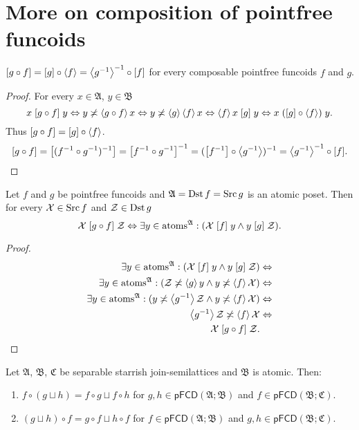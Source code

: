 \section{More on composition of pointfree funcoids}
\begin{prop}
$\mathord{\mathrel{\left[g\circ f\right]}}=\mathord{\mathrel{\left[g\right]}}\circ\left\langle f\right\rangle=\left\langle g^{-1}\right\rangle^{-1}\circ\mathord{\mathrel{\left[f\right]}}$
for every composable pointfree funcoids $f$ and $g$.\end{prop}
\begin{proof}
For every $x\in\mathfrak{A}$, $y\in\mathfrak{B}$
\[
x\mathrel{\left[g\circ f\right]}y\Leftrightarrow y\not\asymp\left\langle g\circ f\right\rangle x\Leftrightarrow y\not\asymp\left\langle g\right\rangle\left\langle f\right\rangle x\Leftrightarrow\left\langle f\right\rangle x\mathrel{\left[g\right]}y\Leftrightarrow x\mathrel{(\mathord{\mathrel{\left[g\right]}}\circ\left\langle f\right\rangle)}y.
\]
Thus $\mathord{\mathrel{\left[g\circ f\right]}}=\mathord{\mathrel{\left[g\right]}}\circ\left\langle f\right\rangle$.
\[
\mathord{\mathrel{\left[g\circ f\right]}}=\mathord{\mathrel{\left[(f^{-1}\circ g^{-1})^{-1}\right]}}=\mathord{\mathrel{\left[f^{-1}\circ g^{-1}\right]}}^{-1}=(\mathord{\mathrel{\left[f^{-1}\right]}}\circ\left\langle g^{-1}\right\rangle)^{-1}=\left\langle g^{-1}\right\rangle^{-1}\circ\mathord{\mathrel{\left[f\right]}}.
\]
\end{proof}
\begin{thm}
\label{pf-fcd-atom-middle}Let $f$ and $g$ be pointfree funcoids
and $\mathfrak{A}=\operatorname{Dst} f=\operatorname{Src} g$ is an atomic poset. Then for every
$\mathcal{X}\in\operatorname{Src} f$ and $\mathcal{Z}\in\operatorname{Dst} g$
\[
\mathcal{X}\mathrel{\left[g\circ f\right]}\mathcal{Z}\Leftrightarrow\exists y\in\operatorname{atoms}^{\mathfrak{A}}:(\mathcal{X}\mathrel{\left[f\right]}y\land y\mathrel{\left[g\right]}\mathcal{Z}).
\]
\end{thm}
\begin{proof}
~
\begin{align*}
\exists y\in\operatorname{atoms}^{\mathfrak{A}}:(\mathcal{X}\mathrel{\left[f\right]}y\land y\mathrel{\left[g\right]}\mathcal{Z}) & \Leftrightarrow\\
\exists y\in\operatorname{atoms}^{\mathfrak{A}}:(\mathcal{Z}\not\asymp\left\langle g\right\rangle y\land y\not\asymp\left\langle f\right\rangle\mathcal{X}) & \Leftrightarrow\\
\exists y\in\operatorname{atoms}^{\mathfrak{A}}:(y\not\asymp\left\langle g^{-1}\right\rangle\mathcal{Z}\land y\not\asymp\left\langle f\right\rangle\mathcal{X}) & \Leftrightarrow\\
\left\langle g^{-1}\right\rangle\mathcal{Z}\not\asymp\left\langle f\right\rangle\mathcal{X} & \Leftrightarrow\\
\mathcal{X}\mathrel{\left[g\circ f\right]}\mathcal{Z}.
\end{align*}
\end{proof}
\begin{thm}
Let $\mathfrak{A}$, $\mathfrak{B}$, $\mathfrak{C}$ be separable
starrish join-semilattices and $\mathfrak{B}$ is atomic. Then:
\begin{enumerate}
\item $f\circ(g\sqcup h)=f\circ g\sqcup f\circ h$ for $g,h\in\mathsf{pFCD}(\mathfrak{A};\mathfrak{B})$
and $f\in\mathsf{pFCD}(\mathfrak{B};\mathfrak{C})$.
\item $(g\sqcup h)\circ f=g\circ f\sqcup h\circ f$ for $f\in\mathsf{pFCD}(\mathfrak{A};\mathfrak{B})$
and $g,h\in\mathsf{pFCD}(\mathfrak{B};\mathfrak{C})$.
\end{enumerate}
\end{thm}
